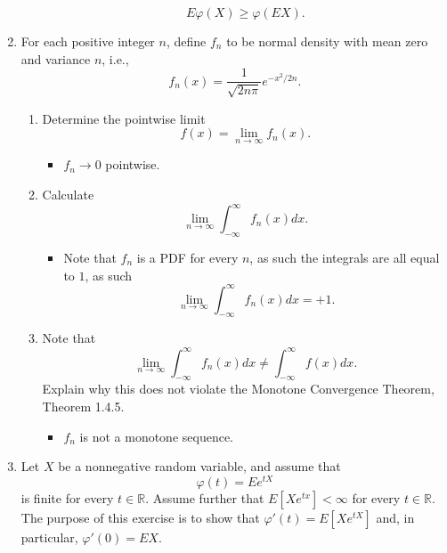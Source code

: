 \documentclass{article}
\newcommand{\R}{\mathbb{R}}
\begin{document}
\begin{enumerate}
\begin{enumerate}
 			$$
 			E\varphi(X) \geq \varphi(EX).
 			$$
	\end{enumerate}
	\item For each positive integer $n$, define $f_n$ to be normal density with mean zero and variance $n$, i.e.,
	$$
	f_n(x) = \frac{1}{\sqrt{2n\pi}}e^{- x^2 / 2n}.
	$$
	\begin{enumerate}
	\item Determine the pointwise limit
	$$
	f(x) = \lim_{n \rightarrow \infty} f_n(x).
	$$
		\begin{itemize}
			\item $f_n \rightarrow 0$ pointwise.
		\end{itemize}
	\item Calculate
	$$
	\lim_{n \rightarrow \infty} \int_{-\infty}^\infty f_n(x) dx.
	$$
		\begin{itemize}
			\item Note that $f_n$ is a PDF for every $n$, as such the integrals are all equal to $1$, as such
			$$
			\lim_{n \rightarrow \infty} \int_{-\infty}^\infty f_n(x) dx = +1.
			$$
		\end{itemize}
	\item Note that
	$$
	\lim_{n \rightarrow \infty} \int_{-\infty}^\infty f_n(x) dx \neq \int_{-\infty}^\infty f(x) dx.
	$$
	Explain why this does not violate the Monotone Convergence Theorem, Theorem 1.4.5.
		\begin{itemize}
			\item $f_n$ is not a monotone sequence.
		\end{itemize}
	\end{enumerate}
	\item Let $X$ be a nonnegative random variable, and assume that
	$$
	\varphi(t) = Ee^{tX}
	$$
	is finite for every $t \in \R$. Assume further that $E\left[Xe^{tx}\right] < \infty$ for every $t \in \R$. The purpose of this exercise is to show that $\varphi'(t) = E\left[Xe^{tX}\right]$ and, in particular, $\varphi'(0) = EX$.


\end{enumerate}
\end{document}
